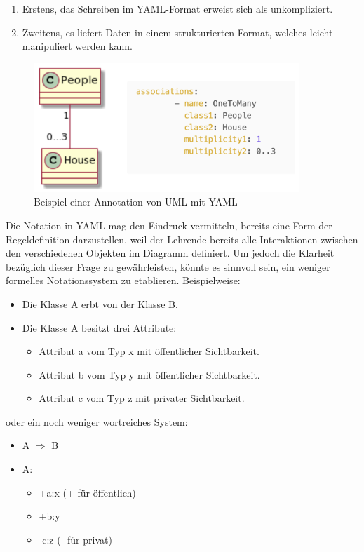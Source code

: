 \begin{enumerate}
    \item Erstens, das Schreiben im YAML-Format erweist sich als unkompliziert.
    \item Zweitens, es liefert Daten in einem strukturierten Format, welches leicht manipuliert werden kann.
\end{enumerate}


\begin{figure}
	\centering
	\includegraphics[width=10cm]{images/yaml-uml}
	\caption{Beispiel einer Annotation von UML mit YAML}
	\label{fig:yaml-uml}
\end{figure}


Die Notation in YAML mag den Eindruck vermitteln, bereits eine Form der Regeldefinition darzustellen, weil der Lehrende bereits alle Interaktionen zwischen den verschiedenen Objekten im Diagramm definiert. Um jedoch die Klarheit bezüglich dieser Frage zu gewährleisten, könnte es sinnvoll sein, ein weniger formelles Notationssystem zu etablieren. Beispielweise:

\begin{itemize}
    \item Die Klasse A erbt von der Klasse B.
    \item Die Klasse A besitzt drei Attribute:
    \begin{itemize}
        \item Attribut a vom Typ x mit öffentlicher Sichtbarkeit.
        \item Attribut b vom Typ y mit öffentlicher Sichtbarkeit.
        \item Attribut c vom Typ z mit privater Sichtbarkeit.
    \end{itemize}
\end{itemize}

oder ein noch weniger wortreiches System: 

\begin{itemize}
    \item A $\Rightarrow$ B 
    \item A:
    \begin{itemize}
        \item +a:x (+ für öffentlich)
        \item +b:y
        \item -c:z (- für privat)
    \end{itemize}
\end{itemize}


